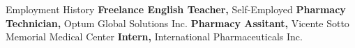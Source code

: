 \begin{rubric}{\faBriefcase[solid] Employment History}
\entry*[2021 -- 2023][]%
	\textbf{Freelance English Teacher,}  Self-Employed
\entry*[2017 -- 2018][]%
	\textbf{Pharmacy Technician,}  Optum Global Solutions Inc. 
\entry*[2015 -- 2016][]%
	\textbf{Pharmacy Assitant,} Vicente Sotto Memorial Medical Center 
%
\entry*[2014 -- 2015][]%
	\textbf{Intern,} International Pharmaceuticals Inc.
%
\end{rubric}